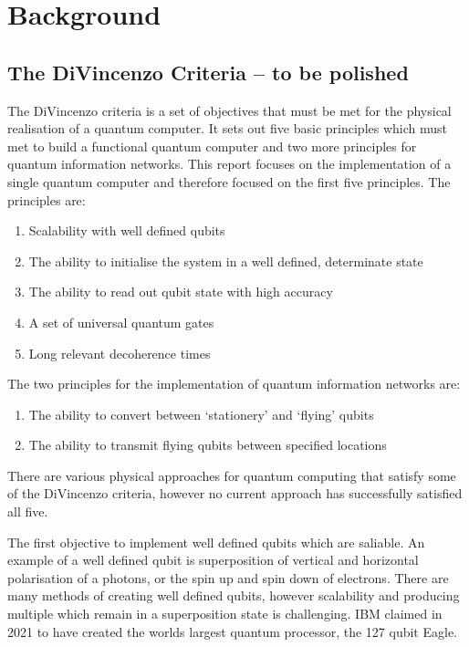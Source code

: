     \section{Background}
\subsection{The DiVincenzo Criteria -- to be polished}
The DiVincenzo criteria is a set of objectives that must be met for the physical realisation of a quantum computer. 
It sets out five basic principles which must met to build a functional quantum computer and two more principles for quantum information networks. \cite{bergou_quantum_2021}
This report focuses on the implementation of a single quantum computer and therefore focused on the first five principles.
The principles are:
\begin{enumerate}
    \item Scalability with well defined qubits
    \item The ability to initialise the system in a well defined, determinate state
    \item The ability to read out qubit state with high accuracy
    \item A set of universal quantum gates
    \item Long relevant decoherence times
    \setcounter{enumTemp}{\theenumi}
\end{enumerate}
The two principles for the implementation of quantum information networks are:
\begin{enumerate}
    \setcounter{enumi}{\theenumTemp}
    \item The ability to convert between `stationery' and `flying' qubits
    \item The ability to transmit flying qubits between specified locations
\end{enumerate}

There are various physical approaches for quantum computing that satisfy some of the DiVincenzo criteria, however no current approach has successfully satisfied all five.
\vspace{1em}

The first objective to implement well defined qubits which are saliable. An example of a well defined qubit is superposition of vertical and horizontal polarisation of a photons, or the spin up and spin down of electrons. 
There are many methods of creating well defined qubits, however scalability and producing multiple which remain in a superposition state is challenging.
IBM claimed in 2021 to have created the worlds largest quantum processor, the 127 qubit Eagle. \cite{authorfullname_ibm_nodate}
\vspace{1em}

